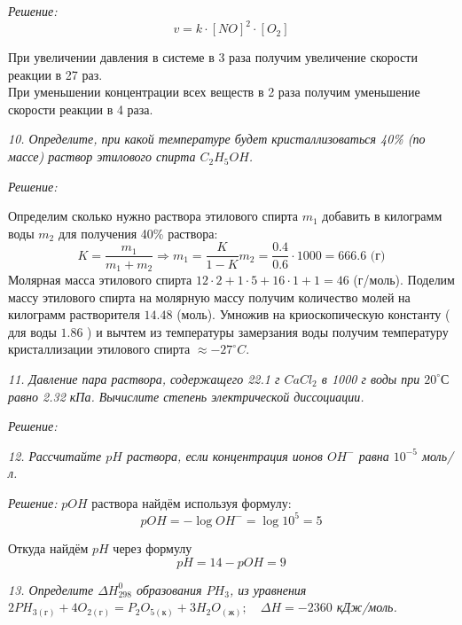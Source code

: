 \emph{Решение:}
\[
	v = k \cdot [NO]^2 \cdot [O_2]
\]

При увеличении давления в системе в 3 раза получим увеличение скорости 
реакции в 27 раз. \\

При уменьшении концентрации всех веществ в 2 раза получим уменьшение 
скорости реакции в 4 раза.

\pagebreak

\emph{10. Определите, при какой температуре будет кристаллизоваться 40\% 
(по массе) раствор этилового спирта \( C_2H_5OH \).}

\emph{Решение:}

Определим сколько нужно раствора этилового спирта \( m_1 \) добавить в 
килограмм воды \( m_2 \) для получения 40\% раствора:
\[
	K = \frac{m_1}{m_1 + m_2} \Rightarrow
	m_1 = \frac{K}{1-K}m_2 = \frac{0.4}{0.6}\cdot 1000 = 666.6 
	\text{ (г)}
\]
Молярная масса этилового спирта 
\( 12 \cdot 2 + 1 \cdot 5 + 16 \cdot 1 + 1 = 46 \) (г/моль). Поделим 
массу этилового спирта на молярную массу получим количество молей на 
килограмм растворителя \( 14.48 \) (моль). Умножив на 
криоскопическую константу ( для воды \( 1.86 \) ) и вычтем из 
температуры замерзания воды получим температуру кристаллизации 
этилового спирта \( \approx -27 ^\circ C\).

\pagebreak

\emph{11. Давление пара раствора, содержащего 22.1 г \( CaCl_2 \) в 
1000 г воды при \( 20 ^{\circ}С \) равно 2.32 кПа. Вычислите степень 
электрической диссоциации.}

\emph{Решение:}

\pagebreak

\emph{12. Рассчитайте \( pH \) раствора, если концентрация ионов 
\( OH^{-} \) равна \( 10^{-5} \) моль/л.}

\emph{Решение:}
\( pOH \) раствора найдём используя формулу:
\[
	pOH = -\log{OH^{-}} = \log{10^5} = 5
\]

Откуда найдём \( pH \) через формулу
\[
	pH = 14 - pOH = 9
\]

\pagebreak

\emph{13. Определите \( \Delta H^{0}_{298} \) образования \( PH_3\), 
из уравнения 
\(
    2PH_{3(\text{г})} + 4O_{2(\text{г})} = 
    P_2 O_{5(\text{к})} + 3H_2 O_{(\text{ж})};\quad
    \Delta H = -2360 
\) кДж/моль.}


